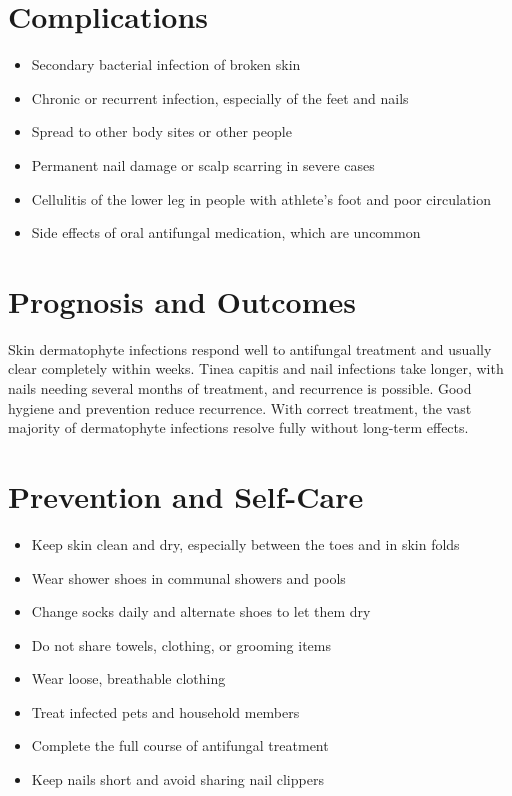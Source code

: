 \section*{Complications}
\begin{itemize}
    \item Secondary bacterial infection of broken skin
    \item Chronic or recurrent infection, especially of the feet and nails
    \item Spread to other body sites or other people
    \item Permanent nail damage or scalp scarring in severe cases
    \item Cellulitis of the lower leg in people with athlete's foot and poor circulation
    \item Side effects of oral antifungal medication, which are uncommon
\end{itemize}

\section*{Prognosis and Outcomes}
Skin dermatophyte infections respond well to antifungal treatment and usually clear completely within weeks. Tinea capitis and nail infections take longer, with nails needing several months of treatment, and recurrence is possible. Good hygiene and prevention reduce recurrence. With correct treatment, the vast majority of dermatophyte infections resolve fully without long-term effects.

\section*{Prevention and Self-Care}
\begin{itemize}
    \item Keep skin clean and dry, especially between the toes and in skin folds
    \item Wear shower shoes in communal showers and pools
    \item Change socks daily and alternate shoes to let them dry
    \item Do not share towels, clothing, or grooming items
    \item Wear loose, breathable clothing
    \item Treat infected pets and household members
    \item Complete the full course of antifungal treatment
    \item Keep nails short and avoid sharing nail clippers
\end{itemize}

